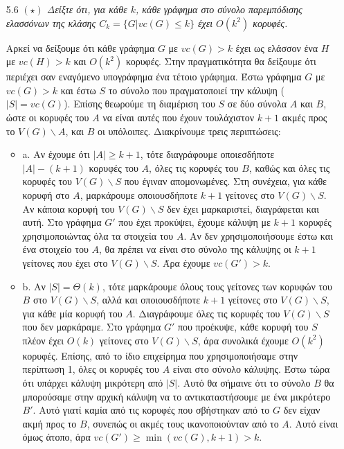 \documentclass[a4paper, oneside, 11pt]{article}
\theoremstyle{definition}
\begin{document}
\begin{enumerate}
	\item[5.6] \emph{$(\star)$ Δείξτε ότι, για κάθε $k$, κάθε γράφημα στο σύνολο παρεμπόδισης ελασσόνων της κλάσης $C_k=\{G|vc(G)\leq k\}$ έχει $O(k^2)$ κορυφές.}

Αρκεί να δείξουμε ότι κάθε γράφημα $G$ με $vc(G)>k$ έχει ως ελάσσον ένα $H$ με $vc(H)>k$ και $O(k^2)$ κορυφές. Στην πραγματικότητα θα δείξουμε ότι περιέχει σαν εναγόμενο υπογράφημα ένα τέτοιο γράφημα.
Έστω γράφημα $G$ με $vc(G)>k$ και έστω $S$ το σύνολο που πραγματοποιεί την κάλυψη ($|S|=vc(G)$). Επίσης θεωρούμε τη διαμέριση του $S$ σε δύο σύνολα $A$ και $B$, ώστε οι κορυφές του $A$ να 
είναι αυτές που έχουν τουλάχιστον
$k+1$ ακμές προς το $V(G)\backslash A$, και $B$ οι υπόλοιπες. Διακρίνουμε τρεις περιπτώσεις: 
\begin{itemize}

\item{a.}
Αν έχουμε ότι $|A| \geq k+1$, τότε διαγράφουμε οποιεσδήποτε $|A|-(k+1)$ κορυφές του $A$, όλες τις κορυφές του $B$, καθώς και όλες τις κορυφές του 
$V(G)\backslash S$ που έγιναν απομονωμένες. Στη συνέχεια, για κάθε κορυφή στο $A$, μαρκάρουμε οποιουσδήποτε $k+1$ γείτονες στο $V(G)\backslash S$. Αν κάποια κορυφή του $V(G)\backslash S$ δεν έχει
μαρκαριστεί, διαγράφεται και αυτή. Στο γράφημα $G'$ 
που έχει προκύψει, έχουμε κάλυψη με $k+1$ κορυφές χρησιμοποιώντας όλα τα στοιχεία του $A$. Αν δεν χρησιμοποιήσουμε έστω και ένα στοιχείο του $A$,
θα πρέπει να είναι στο σύνολο της κάλυψης οι $k+1$ γείτονες που έχει στο $V(G)\backslash S$. Άρα έχουμε $vc(G')>k$.

\item{b.}
Αν $|S|=\Theta(k)$, τότε μαρκάρουμε όλους τους γείτονες των κορυφών του $B$ στο $V(G)\backslash S$, αλλά και οποιουσδήποτε $k+1$ γείτονες στο $V(G)\backslash S$, για κάθε μία κορυφή του $A$.
Διαγράφουμε όλες τις κορυφές του $V(G)\backslash S$ που δεν μαρκάραμε.
Στο γράφημα $G'$ που προέκυψε, κάθε κορυφή του $S$ πλέον έχει $O(k)$ γείτονες στο $V(G)\backslash S$, άρα συνολικά έχουμε $O(k^2)$ κορυφές. Επίσης, από το ίδιο επιχείρημα που χρησιμοποιήσαμε στην
περίπτωση 1, όλες οι κορυφές του $A$ είναι στο σύνολο κάλυψης. Έστω τώρα ότι υπάρχει κάλυψη μικρότερη από $|S|$. Αυτό θα σήμαινε ότι το σύνολο $B$ θα μπορούσαμε στην αρχική κάλυψη να το
αντικαταστήσουμε με ένα μικρότερο $B'$. Αυτό γιατί καμία από τις κορυφές που σβήστηκαν από το $G$ δεν είχαν ακμή προς το $B$, συνεπώς οι ακμές τους ικανοποιούνταν από το $A$. Αυτό είναι όμως άτοπο,
άρα $vc(G')\geq\min(vc(G),k+1)>k$.


\end{itemize}
\end{enumerate}
\end{document}
